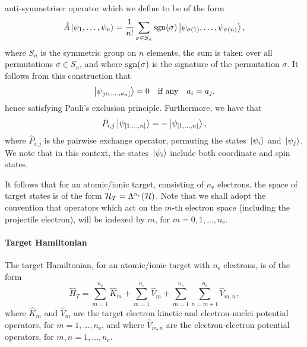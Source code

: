 \documentclass[draft]{article}
\begin{document}
anti-symmetriser operator which we define to be of the form
\begin{equation}
  \label{eq:anti-symmetriser}
  \hat{A}
  \ket{\psi_{1}, \dotsc, \psi_{n}}
  =
  \dfrac{1}{n!}
  \sum_{\sigma \in S_{n}}
  \mathrm{sgn}(\sigma)
  \ket{\psi_{\sigma(1)}, \dotsc, \psi_{\sigma(n)}}
  ,
\end{equation}
where $S_{n}$ is the symmetric group on $n$ elements, the sum is taken over all
permutations $\sigma \in S_{n}$, and where $\mathrm{sgn}(\sigma)$ is the
signature of the permutation $\sigma$.
It follows from this construction that
\begin{equation}
  \label{eq:anti-symmetry}
  \ket{\psi_{\lrsq{a_{1}, \dotsc, a_{n}}}}
  =
  0
  \qq{if any}
  a_{i} = a_{j}
  ,
\end{equation}
hence satisfying Pauli's exclusion principle.
Furthermore, we have that
\begin{equation}
  \label{eq:pairwise-exchange}
  \hat{P}_{i, j}
  \ket{\psi_{[1, \dotsc, n]}}
  =
  -
  \ket{\psi_{[1, \dotsc, n]}}
  ,
\end{equation}
where $\hat{P}_{i, j}$ is the pairwise exchange operator, permuting the states
$\ket*{\psi_{i}}$ and $\ket*{\psi_{j}}$.
We note that in this context, the states $\ket*{\psi_{i}}$ include both coordinate
and spin states.

It follows that for an atomic/ionic target, consisting of $n_{\mathrm{e}}$
electrons, the space of target states is of the form
$\mathcal{H}_{T} = \Lambda^{n_{\mathrm{e}}}(\mathcal{H})$.
Note that we shall adopt the convention that operators which act on the $m$-th
electron space (including the projectile electron), will be indexed by $m$, for
$m = 0, 1, \dotsc, n_{\mathrm{e}}$.

\paragraph{Target Hamiltonian}
\label{sec:target-hamiltonian}

The target Hamiltonian, for an atomic/ionic target with $n_{\mathrm{e}}$
electrons, is of the form
\begin{equation}
  \label{eq:target-hamiltonian}
  \hat{H}_{T}
  =
  \sum_{m = 1}^{n_{\mathrm{e}}}
  \hat{K}_{m}
  +
  \sum_{m = 1}^{n_{\mathrm{e}}}
  \hat{V}_{m}
  +
  \sum_{m = 1}^{n_{\mathrm{e}}}
  \sum_{n = m + 1}^{n_{\mathrm{e}}}
  \hat{V}_{m, n}
  ,
\end{equation}
where $\hat{K}_{m}$ and $\hat{V}_{m}$ are the target electron kinetic and
electron-nuclei potential operators, for $m = 1, \dotsc, n_{\mathrm{e}}$, and
where $\hat{V}_{m, n}$ are the electron-electron potential operators, for
$m, n = 1, \dotsc, n_{\mathrm{e}}$.
\end{document}
